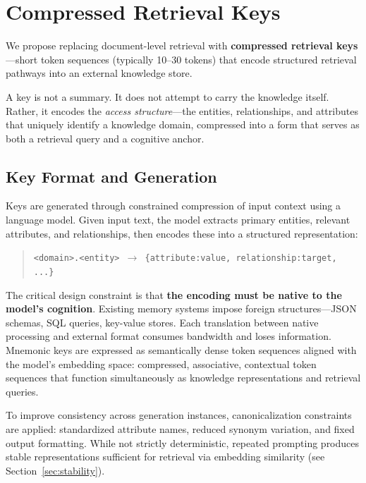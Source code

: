 \documentclass{article}
\begin{document}
\section{Compressed Retrieval Keys}

We propose replacing document-level retrieval with \textbf{compressed retrieval keys}---short token sequences (typically 10--30 tokens) that encode structured retrieval pathways into an external knowledge store.

A key is not a summary. It does not attempt to carry the knowledge itself. Rather, it encodes the \textit{access structure}---the entities, relationships, and attributes that uniquely identify a knowledge domain, compressed into a form that serves as both a retrieval query and a cognitive anchor.

\subsection{Key Format and Generation}

Keys are generated through constrained compression of input context using a language model. Given input text, the model extracts primary entities, relevant attributes, and relationships, then encodes these into a structured representation:

\begin{quote}
\texttt{<domain>.<entity> $\rightarrow$ \{attribute:value, relationship:target, ...\}}
\end{quote}

The critical design constraint is that \textbf{the encoding must be native to the model's cognition}. Existing memory systems impose foreign structures---JSON schemas, SQL queries, key-value stores. Each translation between native processing and external format consumes bandwidth and loses information. Mnemonic keys are expressed as semantically dense token sequences aligned with the model’s embedding space: compressed, associative, contextual token sequences that function simultaneously as knowledge representations and retrieval queries.

To improve consistency across generation instances, canonicalization constraints are applied: standardized attribute names, reduced synonym variation, and fixed output formatting. While not strictly deterministic, repeated prompting produces stable representations sufficient for retrieval via embedding similarity (see Section~\ref{sec:stability}).
\end{document}
